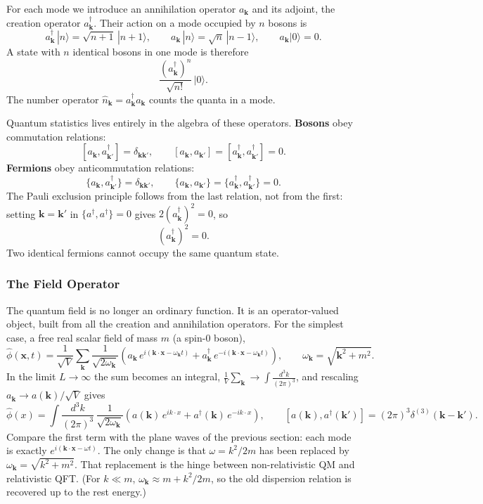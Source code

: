 For each mode we introduce an annihilation operator $a_{\mathbf{k}}$ and its
adjoint, the creation operator $a^\dagger_{\mathbf{k}}$. Their action on a mode
occupied by $n$ bosons is
\[
a^\dagger_{\mathbf{k}}\,|n\rangle = \sqrt{n+1}\,|n+1\rangle ,
\qquad
a_{\mathbf{k}}\,|n\rangle = \sqrt{n}\,|n-1\rangle ,
\qquad
a_{\mathbf{k}}|0\rangle = 0 .
\]
A state with $n$ identical bosons in one mode is therefore
\[
\frac{(a^\dagger_{\mathbf{k}})^n}{\sqrt{n!}}\,|0\rangle .
\]
The number operator $\hat n_{\mathbf{k}} = a^\dagger_{\mathbf{k}}a_{\mathbf{k}}$
counts the quanta in a mode.

Quantum statistics lives entirely in the algebra of these operators.
\textbf{Bosons} obey commutation relations:
\[
[a_{\mathbf{k}}, a^\dagger_{\mathbf{k}'}] = \delta_{\mathbf{k}\mathbf{k}'},
\qquad
[a_{\mathbf{k}}, a_{\mathbf{k}'}] = [a^\dagger_{\mathbf{k}}, a^\dagger_{\mathbf{k}'}] = 0 .
\]
\textbf{Fermions} obey anticommutation relations:
\[
\{a_{\mathbf{k}}, a^\dagger_{\mathbf{k}'}\} = \delta_{\mathbf{k}\mathbf{k}'},
\qquad
\{a_{\mathbf{k}}, a_{\mathbf{k}'}\} = \{a^\dagger_{\mathbf{k}}, a^\dagger_{\mathbf{k}'}\} = 0 .
\]
The Pauli exclusion principle follows from the last relation, not from the
first: setting $\mathbf{k}=\mathbf{k}'$ in $\{a^\dagger,a^\dagger\}=0$ gives
$2(a^\dagger_{\mathbf{k}})^2=0$, so
\[
(a^\dagger_{\mathbf{k}})^2 = 0 .
\]
Two identical fermions cannot occupy the same quantum state.

\subsubsection*{The Field Operator}

The quantum field is no longer an ordinary function. It is an operator-valued
object, built from all the creation and annihilation operators. For the
simplest case, a free real scalar field of mass $m$ (a spin-0 boson),
\[
\hat{\phi}(\mathbf{x},t)
=
\frac{1}{\sqrt{V}}\sum_{\mathbf{k}}
\frac{1}{\sqrt{2\omega_{\mathbf{k}}}}
\left(
a_{\mathbf{k}}\, e^{i(\mathbf{k}\cdot\mathbf{x}-\omega_{\mathbf{k}}t)}
+
a^\dagger_{\mathbf{k}}\, e^{-i(\mathbf{k}\cdot\mathbf{x}-\omega_{\mathbf{k}}t)}
\right),
\qquad
\omega_{\mathbf{k}}=\sqrt{\mathbf{k}^2+m^2}.
\]
In the limit $L\to\infty$ the sum becomes an integral,
$\frac{1}{V}\sum_{\mathbf{k}}\to\int\!\frac{d^3k}{(2\pi)^3}$, and rescaling
$a_{\mathbf{k}}\to a(\mathbf{k})/\sqrt{V}$ gives
\[
\hat{\phi}(x)
=
\int\!\frac{d^3k}{(2\pi)^3}\,\frac{1}{\sqrt{2\omega_{\mathbf{k}}}}
\left(
a(\mathbf{k})\, e^{ik\cdot x}
+
a^\dagger(\mathbf{k})\, e^{-ik\cdot x}
\right),
\qquad
[a(\mathbf{k}),a^\dagger(\mathbf{k}')]=(2\pi)^3\delta^{(3)}(\mathbf{k}-\mathbf{k}').
\]
Compare the first term with the plane waves of the previous section: each mode
is exactly $e^{i(\mathbf{k}\cdot\mathbf{x}-\omega t)}$. The only change is that
$\omega = k^2/2m$ has been replaced by $\omega_{\mathbf{k}}=\sqrt{k^2+m^2}$.
That replacement is the hinge between non-relativistic QM and relativistic QFT.
(For $k\ll m$, $\omega_{\mathbf{k}}\approx m + k^2/2m$, so the old dispersion
relation is recovered up to the rest energy.)

